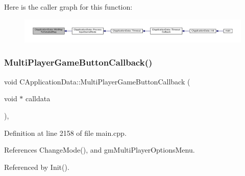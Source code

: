 Here is the caller graph for this function\+:\nopagebreak
\begin{figure}[H]
\begin{center}
\leavevmode
\includegraphics[width=350pt]{classCApplicationData_a3dabde94ddec0eb2c732525f54164bc5_icgraph}
\end{center}
\end{figure}
\hypertarget{classCApplicationData_afabb120415cdadf67edca20c67e8c6fa}{}\label{classCApplicationData_afabb120415cdadf67edca20c67e8c6fa} 
\subsubsection{\texorpdfstring{Multi\+Player\+Game\+Button\+Callback()}{MultiPlayerGameButtonCallback()}}
{\footnotesize\ttfamily void C\+Application\+Data\+::\+Multi\+Player\+Game\+Button\+Callback (\begin{DoxyParamCaption}\item[{void $\ast$}]{calldata }\end{DoxyParamCaption})\hspace{0.3cm}{\ttfamily [static]}, {\ttfamily [protected]}}



Definition at line 2158 of file main.\+cpp.



References Change\+Mode(), and gm\+Multi\+Player\+Options\+Menu.



Referenced by Init().



